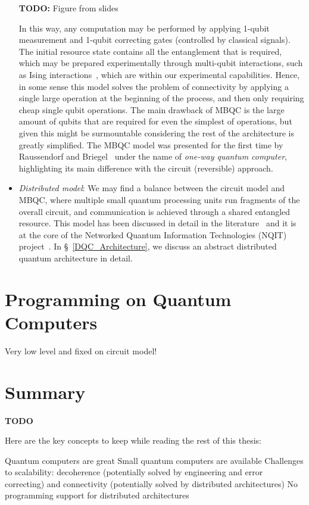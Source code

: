 \begin{itemize}
  \textbf{TODO:} Figure from slides %

  In this way, any computation may be performed by applying 1-qubit measurement and 1-qubit correcting gates (controlled by classical signals). The initial resource state contains all the entanglement that is required, which may be prepared experimentally through multi-qubit interactions, such as Ising interactions~\cite{1WQC}, which are within our experimental capabilities. Hence, in some sense this model solves the problem of connectivity by applying a single large operation at the beginning of the process, and then only requiring cheap single qubit operations. The main drawback of MBQC is the large amount of qubits that are required for even the simplest of operations, but given this might be surmountable considering the rest of the architecture is greatly simplified. The MBQC model was presented for the first time by Raussendorf and Briegel~\cite{1WQC} under the name of \textit{one-way quantum computer}, highlighting its main difference with the circuit (reversible) approach. 

  \item \textit{Distributed model}: We may find a balance between the circuit model and MBQC, where multiple small quantum processing units run fragments of the overall circuit, and communication is achieved through a shared entangled resource. This model has been discussed in detail in the literature~\cite{RealDQC} and it is at the core of the Networked Quantum Information Technologies (NQIT) project~\cite{NQIT}. In \S~\ref{DQC_Architecture}, we discuss an abstract distributed quantum architecture in detail.

\end{itemize}


\section{Programming on Quantum Computers}



Very low level and fixed on circuit model!



\section{Summary}

\textbf{TODO}

Here are the key concepts to keep while reading the rest of this thesis:

Quantum computers are great
Small quantum computers are available
Challenges to scalability: decoherence (potentially solved by engineering and error correcting) and connectivity (potentially solved by distributed architectures)
No programming support for distributed architectures
